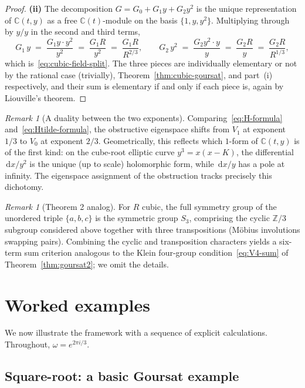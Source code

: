 \documentclass[11pt,a4paper]{article}
\theoremstyle{plain}
\theoremstyle{definition}
\theoremstyle{remark}
\newtheorem{remark}[theorem]{Remark}
\newcommand{\C}{\mathbb{C}}
\newcommand{\Z}{\mathbb{Z}}
\renewcommand{\d}{\,\mathrm{d}}
\begin{document}
\begin{proof}
\smallskip
\noindent\textbf{(ii)} The decomposition $G=G_0+G_1y+G_2y^2$ is the unique representation of $\C(t,y)$ as a free $\C(t)$-module on the basis $\{1,y,y^2\}$. Multiplying through by $y/y$ in the second and third terms,
\[
  G_1\,y \;=\; \frac{G_1 y \cdot y^2}{y^2} \;=\; \frac{G_1 R}{y^2} \;=\; \frac{G_1 R}{R^{2/3}},
  \qquad
  G_2\,y^2 \;=\; \frac{G_2 y^2 \cdot y}{y} \;=\; \frac{G_2 R}{y} \;=\; \frac{G_2 R}{R^{1/3}},
\]
which is~\eqref{eq:cubic-field-split}. The three pieces are individually elementary or not by the rational case (trivially), Theorem~\ref{thm:cubic-goursat}, and part~(i) respectively, and their sum is elementary if and only if each piece is, again by Liouville's theorem.
\end{proof}

\begin{remark}[A duality between the two exponents]
Comparing~\eqref{eq:H-formula} and~\eqref{eq:Htilde-formula}, the obstructive eigenspace shifts from $V_1$ at exponent $1/3$ to $V_0$ at exponent $2/3$. Geometrically, this reflects which $1$-form of $\C(t,y)$ is of the first kind: on the cube-root elliptic curve $y^3=x(x-K)$, the differential $\d x/y^2$ is the unique (up to scale) holomorphic form, while $\d x/y$ has a pole at infinity. The eigenspace assignment of the obstruction tracks precisely this dichotomy.
\end{remark}

\begin{remark}[Theorem 2 analog]
For $R$ cubic, the full symmetry group of the unordered triple $\{a,b,c\}$ is the symmetric group $S_3$, comprising the cyclic $\Z/3$ subgroup considered above together with three transpositions (M\"obius involutions swapping pairs). Combining the cyclic and transposition characters yields a six-term sum criterion analogous to the Klein four-group condition~\eqref{eq:V4-sum} of Theorem~\ref{thm:goursat2}; we omit the details.
\end{remark}


\section{Worked examples}
\label{sec:examples}

We now illustrate the framework with a sequence of explicit calculations. Throughout, $\omega = e^{2\pi i/3}$.

\subsection{Square-root: a basic Goursat example}
\end{document}
